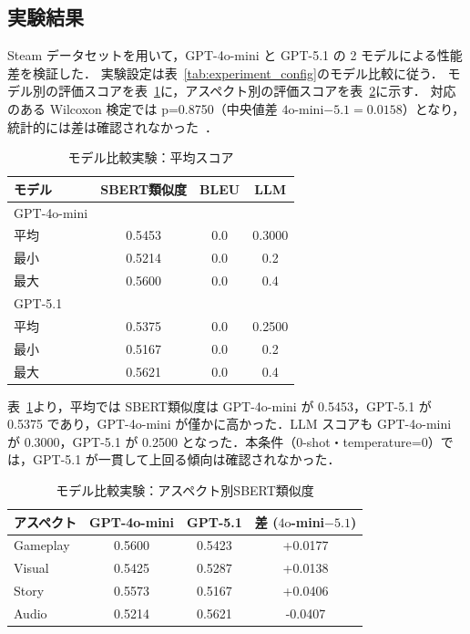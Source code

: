 \subsection{実験結果}
Steam データセットを用いて，GPT-4o-mini と GPT-5.1 の 2 モデルによる性能差を検証した．
実験設定は表~\ref{tab:experiment_config}のモデル比較に従う．
モデル別の評価スコアを表~\ref{tab:model_comparison_summary}に，アスペクト別の評価スコアを表~\ref{tab:model_comparison_aspect}に示す．
対応のある Wilcoxon 検定では p=0.8750（中央値差 $4\mathrm{o}$-mini$-5.1 = 0.0158$）となり，統計的には差は確認されなかった~\cite{wilcoxon1945individual}．
\begin{table}[htbp]
  \centering
  \caption{モデル比較実験：平均スコア}
  \label{tab:model_comparison_summary}
  \begin{tabular}{lccc}
    \toprule
    モデル & SBERT類似度 & BLEU & LLM \\
    \midrule
    GPT-4o-mini & & & \\
    \quad 平均 & 0.5453 & 0.0 & 0.3000 \\
    \quad 最小 & 0.5214 & 0.0 & 0.2 \\
    \quad 最大 & 0.5600 & 0.0 & 0.4 \\
    \midrule
    GPT-5.1 & & & \\
    \quad 平均 & 0.5375 & 0.0 & 0.2500 \\
    \quad 最小 & 0.5167 & 0.0 & 0.2 \\
    \quad 最大 & 0.5621 & 0.0 & 0.4 \\
    \bottomrule
  \end{tabular}
\end{table}

表~\ref{tab:model_comparison_summary}より，平均では SBERT類似度は GPT-4o-mini が 0.5453，GPT-5.1 が 0.5375 であり，GPT-4o-mini が僅かに高かった．LLM スコアも GPT-4o-mini が 0.3000，GPT-5.1 が 0.2500 となった．本条件（0-shot・temperature=0）では，GPT-5.1 が一貫して上回る傾向は確認されなかった．

\begin{table}[htbp]
  \centering
  \caption{モデル比較実験：アスペクト別SBERT類似度}
  \label{tab:model_comparison_aspect}
  \begin{tabular}{lccc}
    \toprule
    アスペクト & GPT-4o-mini & GPT-5.1 & 差 ($4\mathrm{o}$-mini$-5.1$) \\
    \midrule
    Gameplay & 0.5600 & 0.5423 & +0.0177 \\
    Visual & 0.5425 & 0.5287 & +0.0138 \\
    Story & 0.5573 & 0.5167 & +0.0406 \\
    Audio & 0.5214 & 0.5621 & -0.0407 \\
    \bottomrule
  \end{tabular}
\end{table}


